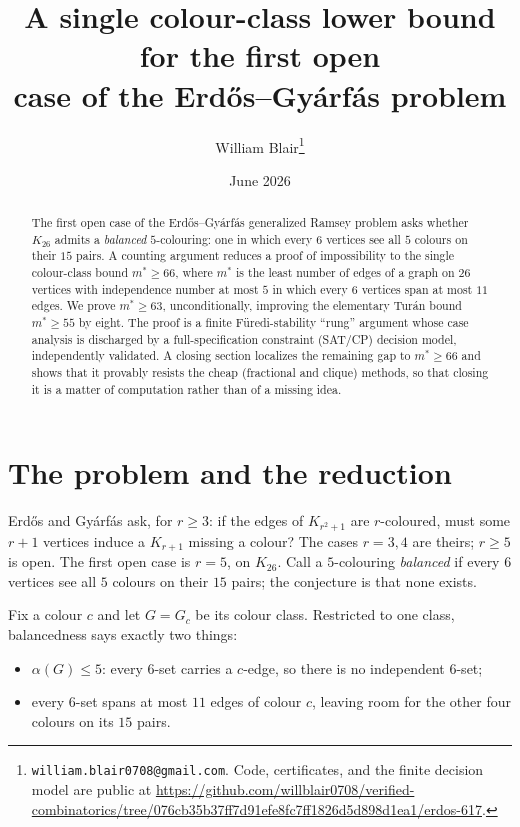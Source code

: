 \documentclass[11pt]{article}
\title{A single colour-class lower bound for the first open\\ case of the Erd\H{o}s--Gy\'arf\'as problem}
\author{William Blair\thanks{\texttt{william.blair0708@gmail.com}. Code, certificates, and the
finite decision model are public at
\url{https://github.com/willblair0708/verified-combinatorics/tree/076cb35b37ff7d91efe8fc7ff1826d5d898d1ea1/erdos-617}.}}
\date{June 2026}
\theoremstyle{definition}
\newcommand{\mstar}{m^{*}}
\newcommand{\Kn}[1]{K_{#1}}
\begin{document}
\maketitle

\begin{abstract}
The first open case of the Erd\H{o}s--Gy\'arf\'as generalized Ramsey problem
\cite{ErGy97} asks whether $\Kn{26}$ admits a \emph{balanced} $5$-colouring: one
in which every $6$ vertices see all $5$ colours on their $15$ pairs. A counting
argument reduces a proof of impossibility to the single colour-class bound
$\mstar \ge 66$, where $\mstar$ is the least number of edges of a graph on $26$
vertices with independence number at most $5$ in which every $6$ vertices span at
most $11$ edges. We prove $\mstar \ge 63$, unconditionally, improving the
elementary Tur\'an bound $\mstar \ge 55$ by eight. The proof is a finite
F\"uredi-stability ``rung'' argument whose case analysis is discharged by a
full-specification constraint (SAT/CP) decision model, independently validated.
A closing section localizes the remaining gap to $\mstar \ge 66$ and shows that it
provably resists the cheap (fractional and clique) methods, so that closing it is
a matter of computation rather than of a missing idea.
\end{abstract}

\section{The problem and the reduction}

Erd\H{o}s and Gy\'arf\'as \cite{ErGy97} ask, for $r \ge 3$: if the edges of
$K_{r^2+1}$ are $r$-coloured, must some $r+1$ vertices induce a $K_{r+1}$ missing a
colour? The cases $r = 3, 4$ are theirs; $r \ge 5$ is open. The first open case is
$r = 5$, on $\Kn{26}$. Call a $5$-colouring \emph{balanced} if every $6$ vertices
see all $5$ colours on their $15$ pairs; the conjecture is that none exists.

Fix a colour $c$ and let $G = G_c$ be its colour class. Restricted to one class,
balancedness says exactly two things:
\begin{itemize}
  \item[\textbf{(A)}] $\alpha(G) \le 5$: every $6$-set carries a $c$-edge, so there
    is no independent $6$-set;
  \item[\textbf{(B)}] every $6$-set spans at most $11$ edges of colour $c$, leaving
    room for the other four colours on its $15$ pairs.
\end{itemize}
\end{document}
